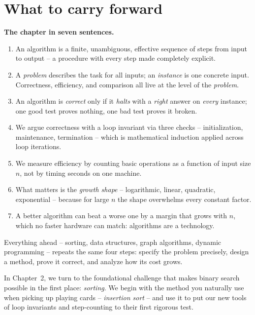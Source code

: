 \section{What to carry forward}

\begin{focusbox}
\textbf{The chapter in seven sentences.}
\begin{enumerate}
  \item An algorithm is a finite, unambiguous, effective sequence of steps from
        input to output -- a procedure with every step made completely explicit.
  \item A \emph{problem} describes the task for all inputs; an \emph{instance} is one
        concrete input. Correctness, efficiency, and comparison all live at the level
        of the \emph{problem}.
  \item An algorithm is \emph{correct} only if it \emph{halts} with a \emph{right}
        answer on \emph{every} instance; one good test proves nothing, one bad test
        proves it broken.
  \item We argue correctness with a loop invariant via three checks --
        initialization, maintenance, termination -- which is mathematical induction
        applied across loop iterations.
  \item We measure efficiency by counting basic operations as a function of input
        size $n$, not by timing seconds on one machine.
  \item What matters is the \emph{growth shape} -- logarithmic, linear, quadratic,
        exponential -- because for large $n$ the shape overwhelms every constant
        factor.
  \item A better algorithm can beat a worse one by a margin that grows with $n$,
        which no faster hardware can match: algorithms are a technology.
\end{enumerate}
\end{focusbox}

Everything ahead -- sorting, data structures, graph algorithms, dynamic programming --
repeats the same four steps: specify the problem precisely, design a method, prove
it correct, and analyze how its cost grows.

In Chapter~2, we turn to the foundational challenge that makes binary search possible
in the first place: \emph{sorting}. We begin with the method you naturally use when
picking up playing cards -- \emph{insertion sort} -- and use it to put our
new tools of loop invariants and step-counting to their first rigorous test.

